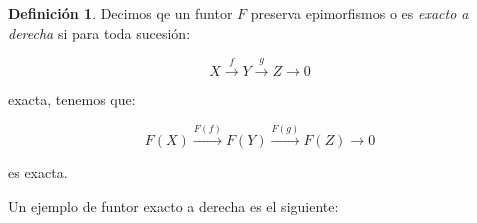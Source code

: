 \documentclass{article}
\theoremstyle{plain}
\theoremstyle{definition}
\newtheorem{definition}[theorem]{Definición}
\theoremstyle{remark}
\begin{document}
\begin{definition}
    Decimos qe un funtor $F$ preserva epimorfismos o es \textit{exacto a derecha} si para toda sucesión:

    \begin{equation*}
        X \xrightarrow{f} Y \xrightarrow{g} Z \longrightarrow 0
    \end{equation*}

    exacta, tenemos que:

    \begin{equation*}
        F(X) \xrightarrow{F(f)} F(Y) \xrightarrow{F(g)} F(Z) \longrightarrow 0
    \end{equation*}

    es exacta.
\end{definition}

Un ejemplo de funtor exacto a derecha es el siguiente:
\end{document}

